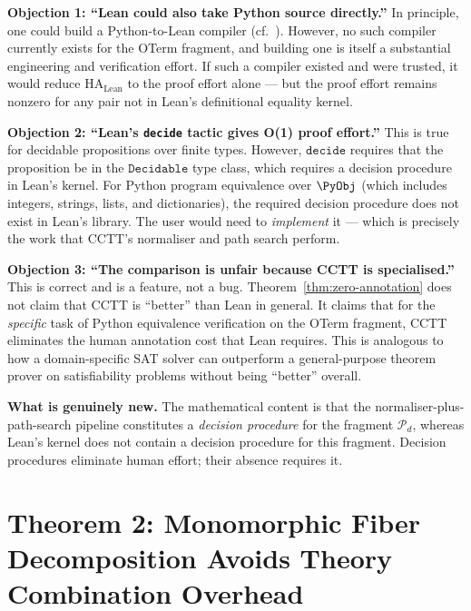 \begin{remark}
\label{rem:adv-annotation}
\textbf{Objection 1: ``Lean could also take Python source directly.''}
In principle, one could build a Python-to-Lean compiler (cf.\
\cite{greenman2014getting}).  However, no such compiler currently
exists for the OTerm fragment, and building one is itself a
substantial engineering and verification effort.  If such a compiler
existed and were trusted, it would reduce $\mathrm{HA}_{\mathrm{Lean}}$
to the proof effort alone — but the proof effort remains nonzero
for any pair not in Lean's definitional equality kernel.

\textbf{Objection 2: ``Lean's \texttt{decide} tactic gives O(1) proof effort.''}
This is true for decidable propositions over finite types.  However,
$\texttt{decide}$ requires that the proposition be in the
$\texttt{Decidable}$ type class, which requires a decision procedure
in Lean's kernel.  For Python program equivalence over $\PyObj$
(which includes integers, strings, lists, and dictionaries), the
required decision procedure does not exist in Lean's library.  The
user would need to \emph{implement} it — which is precisely the work
that CCTT's normaliser and path search perform.

\textbf{Objection 3: ``The comparison is unfair because CCTT is specialised.''}
This is correct and is a feature, not a bug.  Theorem~\ref{thm:zero-annotation}
does not claim that CCTT is ``better'' than Lean in general.  It
claims that for the \emph{specific} task of Python equivalence
verification on the OTerm fragment, CCTT eliminates the human
annotation cost that Lean requires.  This is analogous to how a
domain-specific SAT solver can outperform a general-purpose theorem
prover on satisfiability problems without being ``better'' overall.

\textbf{What is genuinely new.}
The mathematical content is that the normaliser-plus-path-search
pipeline constitutes a \emph{decision procedure} for the fragment
$\mathcal{P}_d$, whereas Lean's kernel does not contain a decision
procedure for this fragment.  Decision procedures eliminate human
effort; their absence requires it.
\end{remark}


\section{Theorem 2: Monomorphic Fiber Decomposition Avoids
         Theory Combination Overhead}
\label{sec:thm-fiber}

